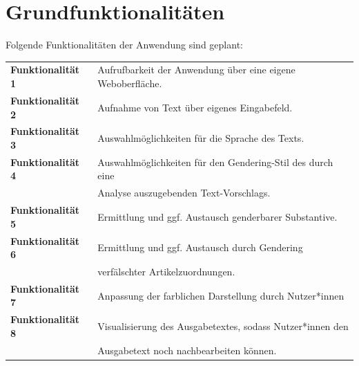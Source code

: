 \documentclass[paper=a4, parskip=half]{scrreprt}
\begin{document}
\section{Grundfunktionalitäten}
\label{sec:Grundfunktionalitäten}
Folgende Funktionalitäten der Anwendung sind geplant:

\begin{table}[!htb]
\begin{tabular}{ll}
\textbf{Funktionalität 1} & Aufrufbarkeit der Anwendung über eine eigene Weboberfläche. \vspace{0.1cm} \\
\textbf{Funktionalität 2} & Aufnahme von Text über eigenes Eingabefeld. \vspace{0.1cm} \\
\textbf{Funktionalität 3} & Auswahlmöglichkeiten für die Sprache des Texts. \vspace{0.1cm} \\
\textbf{Funktionalität 4} & Auswahlmöglichkeiten für den Gendering-Stil des durch eine \\
 & Analyse auszugebenden Text-Vorschlags. \vspace{0.1cm} \\
\textbf{Funktionalität 5} & Ermittlung und ggf. Austausch genderbarer Substantive. \vspace{0.1cm} \\
\textbf{Funktionalität 6} & Ermittlung und ggf. Austausch durch Gendering \\
& verfälschter Artikelzuordnungen. \vspace{0.1cm} \\
\textbf{Funktionalität 7} & Anpassung der farblichen Darstellung durch Nutzer*innen \vspace{0.1cm} \\
\textbf{Funktionalität 8} & Visualisierung des Ausgabetextes, sodass Nutzer*innen den \\
 & Ausgabetext noch nachbearbeiten können. \vspace{0.1cm} \\
\end{tabular}
\end{table}
\end{document}
